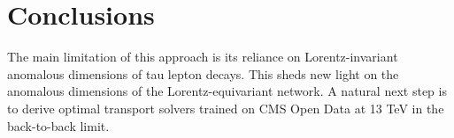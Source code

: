 \section{Conclusions}\label{sec:conclusions}

The main limitation of this approach is its reliance on
Lorentz-invariant anomalous dimensions of tau lepton decays. This sheds
new light on the anomalous dimensions of the Lorentz-equivariant
network. A natural next step is to derive optimal transport solvers
trained on CMS Open Data at 13 TeV in the back-to-back limit.

